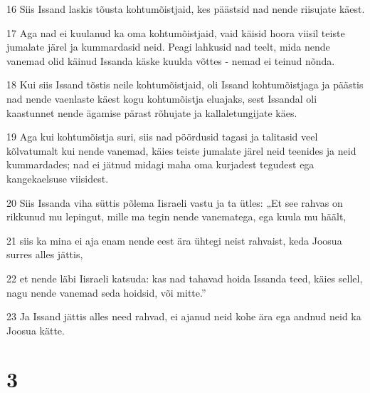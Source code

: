 \par 16 Siis Issand laskis tõusta kohtumõistjaid, kes päästsid nad nende riisujate käest.
\par 17 Aga nad ei kuulanud ka oma kohtumõistjaid, vaid käisid hoora viisil teiste jumalate järel ja kummardasid neid. Peagi lahkusid nad teelt, mida nende vanemad olid käinud Issanda käske kuulda võttes - nemad ei teinud nõnda.
\par 18 Kui siis Issand tõstis neile kohtumõistjaid, oli Issand kohtumõistjaga ja päästis nad nende vaenlaste käest kogu kohtumõistja eluajaks, sest Issandal oli kaastunnet nende ägamise pärast rõhujate ja kallaletungijate käes.
\par 19 Aga kui kohtumõistja suri, siis nad pöördusid tagasi ja talitasid veel kõlvatumalt kui nende vanemad, käies teiste jumalate järel neid teenides ja neid kummardades; nad ei jätnud midagi maha oma kurjadest tegudest ega kangekaelsuse viisidest.
\par 20 Siis Issanda viha süttis põlema Iisraeli vastu ja ta ütles: „Et see rahvas on rikkunud mu lepingut, mille ma tegin nende vanematega, ega kuula mu häält,
\par 21 siis ka mina ei aja enam nende eest ära ühtegi neist rahvaist, keda Joosua surres alles jättis,
\par 22 et nende läbi Iisraeli katsuda: kas nad tahavad hoida Issanda teed, käies sellel, nagu nende vanemad seda hoidsid, või mitte.”
\par 23 Ja Issand jättis alles need rahvad, ei ajanud neid kohe ära ega andnud neid ka Joosua kätte.

\chapter{3}

